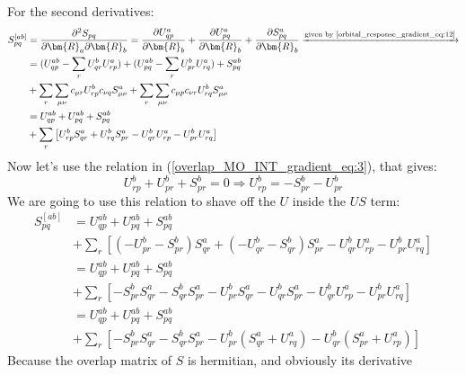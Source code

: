 For the second derivatives:
\begin{align}
  \label{overlap_MO_INT_gradient_eq:4}
S_{pq}^{[ab]} &= \frac{\partial^{2} S_{pq}}{\partial \bm{R}_{a}\partial
\bm{R}_{b}}  = \frac{\partial U^{a}_{qp}}{\partial \bm{R}_{b}} +
\frac{\partial U^{a}_{pq}}{\partial \bm{R}_{b}} + 
\frac{\partial S^{a}_{pq}}{\partial \bm{R}_{b}}
\xrightarrow{\text{given by \ref{orbital_response_gradient_eq:12}}}\nonumber \\
&= (U^{ab}_{qp} - \sum_{r}U^{b}_{qr}U^{a}_{rp}) + (U^{ab}_{pq} -
\sum_{r}U^{b}_{pr}U^{a}_{rq}) + S^{ab}_{pq}  \nonumber \\
&+\sum_{r}\sum_{\mu\nu}
c_{\mu r}U^{b}_{rp}c_{\nu q}S^{a}_{\mu\nu} + \sum_{r}\sum_{\mu\nu} c_{\mu
p}c_{\nu r}U^{b}_{rq}S^{a}_{\mu\nu} \nonumber \\
&= U^{ab}_{qp}  + U^{ab}_{pq} + S^{ab}_{pq} \nonumber \\
&+ \sum_{r}\left[ U^{b}_{rp}S^{a}_{qr} + U^{b}_{rq}S^{a}_{pr} -
U^{b}_{qr}U^{a}_{rp} - U^{b}_{pr}U^{a}_{rq} \right] 
\end{align}
Now let's use the relation in (\ref{overlap_MO_INT_gradient_eq:3}), that gives:
\begin{equation}
 \label{overlap_MO_INT_gradient_eq:5}
U^{b}_{rp} +
U^{b}_{pr} + S^{b}_{pr} = 0 \Longrightarrow U^{b}_{rp} = -S^{b}_{pr} -
U^{b}_{pr} 
\end{equation}
We are going to use this relation to shave off the $U$ inside the $US$ term:
\begin{align}
 \label{overlap_MO_INT_gradient_eq:6}
S_{pq}^{[ab]} &= U^{ab}_{qp}  + U^{ab}_{pq} + S^{ab}_{pq} \nonumber \\
&+ \sum_{r}\left[ \left( -U^{b}_{pr} - S^{b}_{pr}\right) S^{a}_{qr} +
\left( -U^{b}_{qr} - S^{b}_{qr}\right) S^{a}_{pr} -U^{b}_{qr}U^{a}_{rp} -
U^{b}_{pr}U^{a}_{rq} \right] \nonumber \\
&=  U^{ab}_{qp}  + U^{ab}_{pq} + S^{ab}_{pq} \nonumber \\
&+ \sum_{r}\left[ -S^{b}_{pr} S^{a}_{qr}  - S^{b}_{qr} S^{a}_{pr}
-U^{b}_{pr} S^{a}_{qr} -U^{b}_{qr}S^{a}_{pr}
 -U^{b}_{qr}U^{a}_{rp} - U^{b}_{pr}U^{a}_{rq} \right] \nonumber \\
&=  U^{ab}_{qp}  + U^{ab}_{pq} + S^{ab}_{pq} \nonumber \\
&+ \sum_{r}\left[ -S^{b}_{pr} S^{a}_{qr}  - S^{b}_{qr} S^{a}_{pr}
-U^{b}_{pr}\left( S^{a}_{qr} + U^{a}_{rq} \right) 
-U^{b}_{qr}\left( S^{a}_{pr} + U^{a}_{rp}\right) \right]
\end{align}
Because the overlap matrix of $S$ is hermitian, and obviously its derivative
